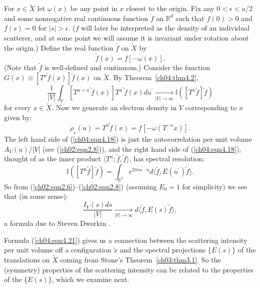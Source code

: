 \documentclass[reqno]{stml-l}
\theoremstyle{plain}
\theoremstyle{definition}
\numberwithin{equation}{chapter}
\begin{document}
For $x\in\tilde{X}$ let $\omega(x)$ be any point in $x$ closest to the origin. Fix any $0<\epsilon<a/2$ and some nonnegative real continuous function $f$ on $\mathbb{R}^{d}$ such that $f(0)>0$ and $f(s)=0$ for $|s|>\epsilon$. ($f$ will later be interpreted as the density of an individual scatterer, and at some point we will assume it is invariant under rotation about the origin.) Define the real function $\tilde{f}$ on $\tilde{X}$ by
\begin{equation}\label{ch04:eqn4.17}
\tilde{f}(x)=f[-\omega(x)].
\end{equation}
(Note that $\tilde{f}$ is well-defined and continuous.) Consider the function $G(x)\equiv[T^{u}\tilde{f}(x)]\tilde{f}(x)$ on $\tilde{X}$. By Theorem~\ref{ch04:thm4.2},
\begin{equation}\label{ch04:eqn4.18}
\frac{1}{|V|}\int_{V}[T^{u+u^{\prime}}\tilde{f}(x)]T^{u^{\prime}}\tilde{f}(x)du^{\prime}\mathop{\longrightarrow}\limits_{|V|\rightarrow\infty} \mathbb{I}([T^{u}\tilde{f}]\tilde{f})
\end{equation}
for every $x\in\tilde{X}$. Now we generate an electron density in $V$ corresponding to $x$ given by:
\begin{equation}\label{ch04:eqn4.19}
\rho_{_{V}}(u)=T^{u}\tilde{f}(x)=f[-\omega(T^{-u}x)].
\end{equation}
The left hand side of (\ref{ch04:eqn4.18}) is just the
autocorrelation per unit volume $A_{V}(u)/|V|$ (see
(\ref{ch02:eqn2.8})), and the right hand side of
(\ref{ch04:eqn4.18}), thought of as the inner product
$\langle T^{u};\tilde{f},\tilde{f}\rangle$, has spectral
resolution:
\begin{equation}\label{ch04:eqn4.20}
\mathbb{I}([T^{u}\tilde{f}]\tilde{f})=\int_{\mathbb{R}^{3}}e^{2\pi iu^{\prime}\cdot u}d\langle \tilde{f}, E(u^{\prime})\tilde{f}\rangle.
\end{equation}
So from (\ref{ch02:eqn2.6})--(\ref{ch02:eqn2.8}) (assuming $E_{0}=1$ for simplicity) we see that (in some sense):
\begin{equation}\label{ch04:eqn4.21}
\frac{I_{V}(s)ds}{|V|}\mathop{\longrightarrow}\limits_{|V|\rightarrow\infty} d\langle \tilde{f}, E(s)\tilde{f}\rangle,
\end{equation}
a formula due to Steven Dworkin \cite{bib:Dwo}.

Formula (\ref{ch04:eqn4.21}) gives us a connection between the scattering intensity per unit volume off a configuration $\tilde{x}$ and the spectral projections $\{E(s)\}$ of the translations on $\tilde{X}$ coming from Stone's Theorem~\ref{ch03:thm3.1}. So the (symmetry) properties of the scattering intensity can be related to the properties of the $\{E(s)\}$, which we examine next.
\end{document}
